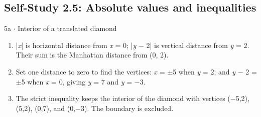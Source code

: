 \documentclass[11pt]{article}
\begin{document}
\begin{keepsection}\subsection{Self-Study 2.5: Absolute values and inequalities}

\begin{workedbox}{5a \ensuremath{\cdot} Interior of a translated diamond}
\begin{enumerate}
\item |\textit{x}| is horizontal distance from \textit{x} = 0; |\textit{y} \ensuremath{-} 2| is vertical distance from \textit{y} = 2. Their sum is the Manhattan distance from (0, 2).
\item Set one distance to zero to find the vertices: \textit{x} = \ensuremath{\pm}5 when \textit{y} = 2; and \textit{y} \ensuremath{-} 2 = \ensuremath{\pm}5 when \textit{x} = 0, giving \textit{y} = 7 and \textit{y} = \ensuremath{-}3.
\item {}
The strict inequality keeps the interior of the diamond with vertices (\ensuremath{-}5,2), (5,2), (0,7), and (0,\ensuremath{-}3). The boundary is excluded.


\end{enumerate}
\end{workedbox}
\end{keepsection}
\end{document}
